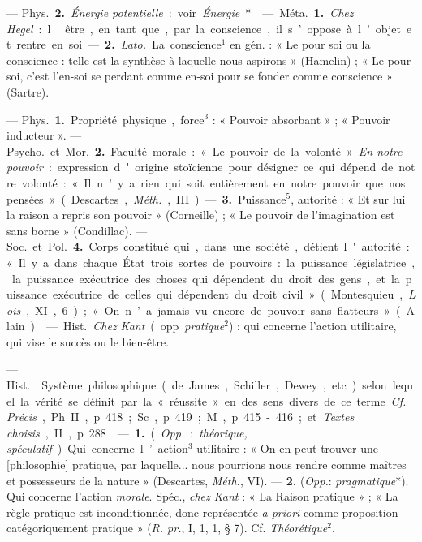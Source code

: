 \begin{itemize}[leftmargin=1cm, label=, itemsep=1pt]
— \si{Phys.} {\bf 2.} {\it Énergie potentielle} : voir {\it Énergie}*.

 — \si{Méta.} {\bf 1.} {\it Chez Hegel} : l'être, en tant que,
par la conscience, il s’oppose à l’objet et rentre en soi. —  {\bf 2.}
{\it Lato.} La conscience$^1$ en gén. : « Le pour soi ou la conscience :
telle est la synthèse à laquelle nous aspirons » (Hamelin) ; « Le pour-soi,
c’est l’en-soi se perdant comme en-soi pour se fonder comme conscience
» (Sartre).

 — \si{Phys.} {\bf 1.} Propriété physique, force$^3$ : « Pouvoir
absorbant » ; « Pouvoir inducteur ». — \si{Psycho.} et \si{Mor.} {\bf 2.}
Faculté morale : « Le pouvoir de la volonté ». {\it En notre pouvoir} :
expression d'origine stoïcienne pour désigner ce qui dépend de notre
volonté : « Il n’y a rien qui soit entièrement en notre pouvoir que nos
pensées » (Descartes, {\it Méth.}, III). — {\bf 3.} Puissance$^5$, autorité :
« Et sur lui la raison a repris son pouvoir » (Corneille) ; « Le pouvoir de
l'imagination est sans borne » (Condillac). — \si{Soc.} et \si{Pol.}
{\bf 4.} Corps constitué qui, dans une société, détient l'autorité : « Il y a
dans chaque État trois sortes de pouvoirs : la puissance législatrice, la
puissance exécutrice des choses qui dépendent du droit des gens, et la
puissance exécutrice de celles qui dépendent du droit civil » (Montesquieu,
{\it Lois}, XI, 6) ; « On n’a jamais vu encore de pouvoir sans flatteurs
» (Alain).

 — \si{Hist.} {\it Chez Kant} (opp. {\it pratique}$^2$) : qui
concerne l'action utilitaire, qui vise le succès ou le bien-être.

 — \si{Hist.}  Système philosophique (de
James, Schiller, Dewey, etc.) selon lequel la vérité se définit par la «
réussite » en des sens divers de ce terme. {\it Cf.} {\it Précis}, Ph. II, p.
418; Sc., p. 419; M., p. 415-416; et {\it Textes choisis}, II, p. 288.

 — {\bf 1.} ({\it Opp.} : {\it théorique, spéculatif}).
Qui concerne l’action$^3$ utilitaire : « On en peut trouver une [philosophie]
pratique, par laquelle... nous pourrions nous rendre comme maîtres et
possesseurs de la nature » (Descartes, {\it Méth.}, VI). — {\bf 2.}
({\it Opp.}: {\it pragmatique}*). Qui concerne l’action
{\it morale}. Spéc., {\it chez Kant} : « La Raison pratique » ; « La règle
pratique est inconditionnée, donc représentée {\it a priori} comme
proposition catégoriquement pratique » ({\it R. pr.}, I, 1, 1, § 7). Cf.
{\it Théorétique}$^2$.


\end{itemize}
